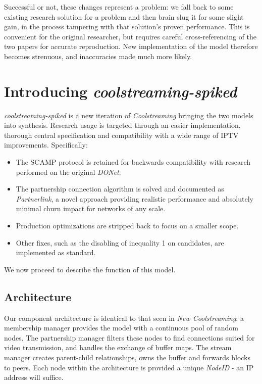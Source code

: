 \documentclass[12pt,a4paper]{article}
\begin{document}
Successful or not, these changes represent a problem: we fall back to some existing research solution for a problem and then brain slug  it for some slight gain, in the process tampering with that solution's proven performance. This is convenient for the original researcher, but requires careful cross-referencing of the two papers for accurate reproduction. New implementation of the model therefore becomes strenuous, and inaccuracies made much more likely.


\section{Introducing \textit{coolstreaming-spiked}} \label{css}
\textit{coolstreaming-spiked} is a new iteration of \textit{Coolstreaming} bringing the two models into synthesis. Research usage is targeted through an easier implementation, thorough central specification and compatibility with a wide range of IPTV improvements. Specifically:

\begin{itemize}
	\item The SCAMP protocol is retained for backwards compatibility with research performed on the original \textit{DONet}.
	\item The partnership connection algorithm is solved and documented as \textit{Partnerlink}, a novel approach providing realistic performance and absolutely minimal churn impact for networks of any scale.
	\item Production optimizations are stripped back to focus on a smaller scope.
	\item Other fixes, such as the disabling of inequality 1 on candidates, are implemented as standard.
\end{itemize}

We now proceed to describe the function of this model.

\subsection{Architecture} \label{css:architecture}
Our component architecture is identical to that seen in \textit{New Coolstreaming}: a membership manager provides the model with a continuous pool of random nodes. The partnership manager filters these nodes to find connections suited for video transmission, and handles the exchange of buffer maps. The stream manager creates parent-child relationships, owns the buffer and forwards blocks to peers. Each node within the architecture is provided a unique \textit{NodeID} - an IP address will suffice.
\end{document}
